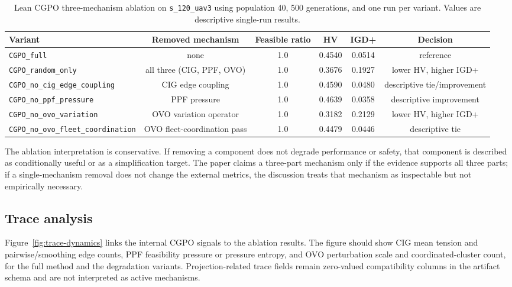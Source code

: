 \begin{table}[t]
\centering
\caption{Lean CGPO three-mechanism ablation on \texttt{s\_120\_uav3} using population 40, 500 generations, and one run per variant. Values are descriptive single-run results.}
\label{tab:ablation}
\small
\setlength{\tabcolsep}{4pt}
\begin{tabular*}{\textwidth}{@{\extracolsep{\fill}}lccccc}
\toprule
Variant & Removed mechanism & Feasible ratio & HV & IGD+ & Decision \\
\midrule
\texttt{CGPO\_full} & none & 1.0 & 0.4540 & 0.0514 & reference \\
\texttt{CGPO\_random\_only} & all three (CIG, PPF, OVO) & 1.0 & 0.3676 & 0.1927 & lower HV, higher IGD+ \\
\texttt{CGPO\_no\_cig\_edge\_coupling} & CIG edge coupling & 1.0 & 0.4590 & 0.0480 & descriptive tie/improvement \\
\texttt{CGPO\_no\_ppf\_pressure} & PPF pressure & 1.0 & 0.4639 & 0.0358 & descriptive improvement \\
\texttt{CGPO\_no\_ovo\_variation} & OVO variation operator & 1.0 & 0.3182 & 0.2129 & lower HV, higher IGD+ \\
\texttt{CGPO\_no\_ovo\_fleet\_coordination} & OVO fleet-coordination pass & 1.0 & 0.4479 & 0.0446 & descriptive tie \\
\bottomrule
\end{tabular*}
\end{table}

The ablation interpretation is conservative. If removing a component does not degrade performance or safety, that component is described as conditionally useful or as a simplification target. The paper claims a three-part mechanism only if the evidence supports all three parts; if a single-mechanism removal does not change the external metrics, the discussion treats that mechanism as inspectable but not empirically necessary.

\subsection{Trace analysis}
\label{subsec:trace}

Figure~\ref{fig:trace-dynamics} links the internal CGPO signals to the ablation results. The figure should show CIG mean tension and pairwise/smoothing edge counts, PPF feasibility pressure or pressure entropy, and OVO perturbation scale and coordinated-cluster count, for the full method and the degradation variants. Projection-related trace fields remain zero-valued compatibility columns in the artifact schema and are not interpreted as active mechanisms.

